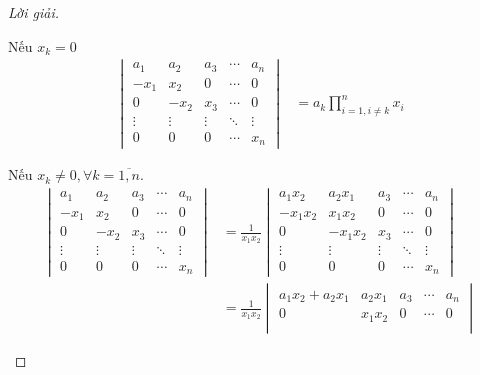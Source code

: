 \documentclass[class=nhvh-linear-algebra,crop=false]{standalone}
\begin{document}
\begin{proof}[Lời giải]
\begin{enumerate}[label = (\alph*)]
		      \par Nếu $x_{k} = 0$
		      \begin{align*}
			      \begin{vmatrix}
				      a_{1}  & a_{2}  & a_{3}  & \cdots & a_{n}  \\
				      -x_{1} & x_{2}  & 0      & \cdots & 0      \\
				      0      & -x_{2} & x_{3}  & \cdots & 0      \\
				      \vdots & \vdots & \vdots & \ddots & \vdots \\
				      0      & 0      & 0      & \cdots & x_{n}
			      \end{vmatrix}
			       & = a_{k}\prod^{n}_{i=1,i\ne k} x_{i}
		      \end{align*}
		      \par Nếu $x_{k} \ne 0, \forall k=\overline{1, n}$.
		      \begingroup{}
		      \allowdisplaybreaks{}
		      \begin{align*}
			      \begin{vmatrix}
				      a_{1}  & a_{2}  & a_{3}  & \cdots & a_{n}  \\
				      -x_{1} & x_{2}  & 0      & \cdots & 0      \\
				      0      & -x_{2} & x_{3}  & \cdots & 0      \\
				      \vdots & \vdots & \vdots & \ddots & \vdots \\
				      0      & 0      & 0      & \cdots & x_{n}
			      \end{vmatrix}
			       & =
			      \frac{1}{x_{1}x_{2}}
			      \begin{vmatrix}
				      a_{1}x_{2}  & a_{2}x_{1}  & a_{3}  & \cdots & a_{n}  \\
				      -x_{1}x_{2} & x_{1}x_{2}  & 0      & \cdots & 0      \\
				      0           & -x_{1}x_{2} & x_{3}  & \cdots & 0      \\
				      \vdots      & \vdots      & \vdots & \ddots & \vdots \\
				      0           & 0           & 0      & \cdots & x_{n}
			      \end{vmatrix}                                                                                                \\
			       & = \frac{1}{x_{1}x_{2}}
			      \begin{vmatrix}
				      a_{1}x_{2} + a_{2}x_{1} & a_{2}x_{1}  & a_{3}  & \cdots & a_{n}  \\
				      0                       & x_{1}x_{2}  & 0      & \cdots & 0      \\

\end{vmatrix}
\end{align*}
\end{enumerate}
\end{proof}
\end{document}
